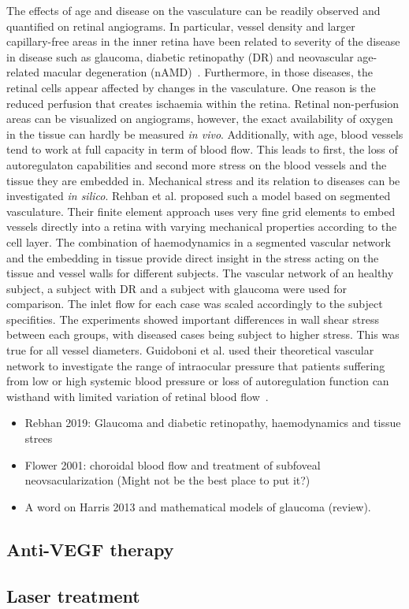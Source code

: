 \documentclass[12pt,a4paper]{article}
\begin{document}
The effects of age and disease on the vasculature can be readily observed and quantified on retinal angiograms.
In particular, vessel density and larger capillary-free areas in the inner retina have been related to severity of the disease in disease such as glaucoma, diabetic retinopathy (DR) and neovascular age-related macular degeneration (nAMD)~\cite{Al_Sheikh_2016, Rao_2020, Yuan_2020}.
Furthermore, in those diseases, the retinal cells appear affected by changes in the vasculature.
One reason is the reduced perfusion that creates ischaemia within the retina.
Retinal non-perfusion areas can be visualized on angiograms, however, the exact availability of oxygen in the tissue can hardly be measured \textit{in vivo}.
Additionally, with age, blood vessels tend to work at full capacity in term of blood flow.
This leads to first, the loss of autoregulaton capabilities and second more stress on the blood vessels and the tissue they are embedded in.
Mechanical stress and its relation to diseases can be investigated \textit{in silico}.
Rehban et al. proposed such a model based on segmented vasculature.
Their finite element approach uses very fine grid elements to embed vessels directly into a retina with varying mechanical properties according to the cell layer.
The combination of haemodynamics in a segmented vascular network and the embedding in tissue provide direct insight in the stress acting on the tissue and vessel walls for different subjects.
The vascular network of an healthy subject, a subject with DR and a subject with glaucoma were used for comparison.
The inlet flow for each case was scaled accordingly to the subject specifities.
The experiments showed important differences in wall shear stress between each groups, with diseased cases being subject to higher stress.
This was true for all vessel diameters.
Guidoboni et al. used their theoretical vascular network to investigate the range of intraocular pressure that patients suffering from low or high systemic blood pressure or loss of autoregulation function can wisthand with limited variation of retinal blood flow~\cite{Guidoboni_2014b}.




\begin{itemize}
\item Rebhan 2019: Glaucoma and diabetic retinopathy, haemodynamics and tissue strees
\item Flower 2001: choroidal blood flow and treatment of subfoveal neovsacularization (Might not be the best place to put it?)
\item A word on Harris 2013 and mathematical models of glaucoma (review).
\end{itemize}


\subsection{Anti-VEGF therapy}

\subsection{Laser treatment}

{\normalsize }
\end{document}
